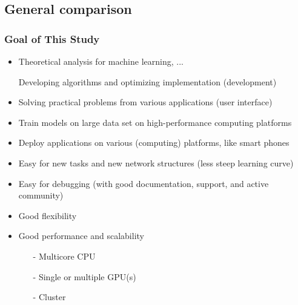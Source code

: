 \subsection{General comparison}


\begin{frame}
  \MyLogo
  \frametitle{Goal of This Study}  
\small

\medskip
{}
\begin{itemize}
\item Theoretical analysis for machine learning, ...
\item[\raisebox{-0.4ex}{\alert{\HandRight}}] Developing algorithms and optimizing implementation (development)
\item Solving practical problems from various applications (user interface)
\end{itemize}

\begin{itemize}
\item Train models on large data set on high-performance computing platforms
\item Deploy applications on various (computing) platforms, like smart phones
\end{itemize}

\begin{itemize}
\item Easy for new tasks and new network structures (less steep learning curve)
\item Easy for debugging (with good \alert{documentation}, \alert{support}, and active community)
\item Good flexibility
\item Good performance and scalability
	\begin{itemize}\scriptsize
	\item[-] Multicore CPU
	\item[-] \alert{Single} or \alert{multiple} GPU(s)
	\item[-] Cluster
	\end{itemize}
\end{itemize}

\end{frame}


